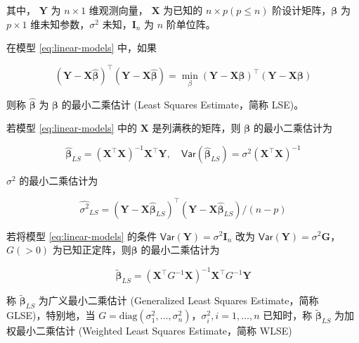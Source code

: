 \documentclass[12pt,a4paper,UTF8,twoside]{book}
\theoremstyle{definition}
\theoremstyle{definition}
\theoremstyle{definition}
\theoremstyle{remark}
\let\BeginKnitrBlock\begin \let\EndKnitrBlock\end
\begin{document}
其中， \(\mathbf{Y}\) 为 \(n \times 1\) 维观测向量， \(\mathbf{X}\)
为已知的 \(n \times p (p \leq n)\) 阶设计矩阵，\(\boldsymbol{\beta}\) 为
\(p \times 1\) 维未知参数，\(\sigma^2\) 未知，\(\mathbf{I}_{n}\) 为
\(n\) 阶单位阵。

\BeginKnitrBlock{definition}[最小二乘估计]
\protect\hypertarget{def:least-squares-estimate}{}{\label{def:least-squares-estimate}
{} }在模型 \eqref{eq:linear-models} 中，如果

\begin{equation}
(\mathbf{Y} - \mathbf{X}\hat{\boldsymbol{\beta}})^{\top}(\mathbf{Y} - \mathbf{X}\hat{\boldsymbol{\beta}}) = \min_{\beta}(\mathbf{Y} - \mathbf{X}\boldsymbol{\beta})^{\top}(\mathbf{Y} - \mathbf{X}\boldsymbol{\beta}) \label{eq:least-squares}
\end{equation}

\noindent 则称 \(\hat{\boldsymbol{\beta}}\) 为 \(\boldsymbol{\beta}\)
的最小二乘估计 (Least Squares Estimate，简称 LSE)。
\EndKnitrBlock{definition}

\BeginKnitrBlock{theorem}[最小二乘估计]
\protect\hypertarget{thm:unbiased}{}{\label{thm:unbiased}
{} }若模型 \eqref{eq:linear-models} 中的
\(\mathbf{X}\) 是列满秩的矩阵，则 \(\boldsymbol{\beta}\)
的最小二乘估计为

\[
\hat{\boldsymbol{\beta}}_{LS} = ( \mathbf{X}^{\top}\mathbf{X} )^{-1}\mathbf{X}^{\top} \mathbf{Y}, \quad  \mathsf{Var}(\hat{\boldsymbol{\beta}}_{LS}) = \sigma^2 (\mathbf{X}^{\top}\mathbf{X})^{-1}  
\]

\noindent \(\sigma^2\) 的最小二乘估计为

\[
\hat{\sigma^2}_{LS} = (\mathbf{Y} - \mathbf{X}\hat{\boldsymbol{\beta}}_{LS})^{\top}(\mathbf{Y} - \mathbf{X}\hat{\boldsymbol{\beta}}_{LS})/(n - p)
\]

若将模型 \eqref{eq:linear-models} 的条件
\(\mathsf{Var}(\mathbf{Y}) = \sigma^2 \mathbf{I}_{n}\) 改为
\(\mathsf{Var}(\mathbf{Y}) = \sigma^2 \mathbf{G}\)， \(G(>0)\)
为已知正定阵，则\(\boldsymbol{\beta}\) 的最小二乘估计为

\[
\tilde{\boldsymbol{\beta}}_{LS} = ( \mathbf{X}^{\top} G^{-1} \mathbf{X})^{-1} \mathbf{X}^{\top} G^{-1} \mathbf{Y} 
\]

\noindent 称 \(\tilde{\boldsymbol{\beta}}_{LS}\) 为广义最小二乘估计
(Generalized Least Squares Estimate，简称 GLSE)，特别地，当
\(G = \mathrm{diag}(\sigma^2_{1},\ldots,\sigma^2_{n})\)，\(\sigma^2_{i},i = 1,\ldots,n\)
已知时，称 \(\tilde{\boldsymbol{\beta}}_{LS}\) 为加权最小二乘估计
(Weighted Least Squares Estimate，简称 WLSE)\citep{wang2004}
\EndKnitrBlock{theorem}
\end{document}
